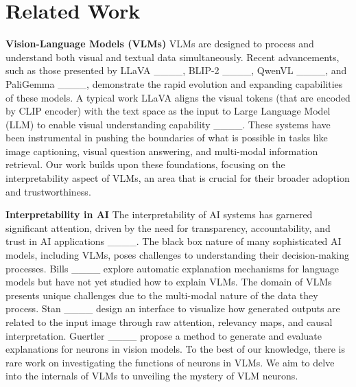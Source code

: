 \section{Related Work}
\label{sec:related_work}


\noindent\textbf{Vision-Language Models (VLMs)} VLMs are designed to process and understand both visual and textual data simultaneously.  Recent advancements, such as those presented by LLaVA ____, BLIP-2 ____, QwenVL ____, and PaliGemma ____, demonstrate the rapid evolution and expanding capabilities of these models. A typical work LLaVA aligns the visual tokens (that are encoded by CLIP encoder) with the text space as the input to Large Language Model (LLM) to enable visual understanding capability ____. These systems have been instrumental in pushing the boundaries of what is possible in tasks like image captioning, visual question answering, and multi-modal information retrieval. Our work builds upon these foundations, focusing on the interpretability aspect of VLMs, an area that is crucial for their broader adoption and trustworthiness.



\noindent\textbf{Interpretability in AI} The interpretability of AI systems has garnered significant attention, driven by the need for transparency, accountability, and trust in AI applications ____. The black box nature of many sophisticated AI models, including VLMs, poses challenges to understanding their decision-making processes. Bills \etal ____ explore automatic explanation mechanisms for language models but have not yet studied how to explain VLMs. The domain of VLMs presents unique challenges due to the multi-modal nature of the data they process. Stan \etal____ design an interface to visualize how generated outputs are related to the input image through raw attention, relevancy maps, and causal interpretation. Guertler \etal ____ propose a method to generate and evaluate explanations for neurons in vision models. To the best of our knowledge, there is rare work on investigating the functions of neurons in VLMs. We aim to delve into the internals of VLMs to unveiling the mystery of VLM neurons.